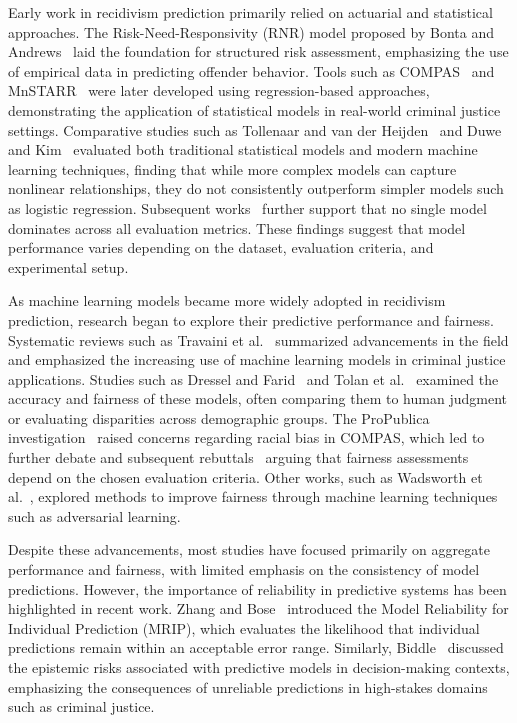 \documentclass[12pt]{article}
\begin{document}
Early work in recidivism prediction primarily relied on actuarial and statistical approaches. The Risk-Need-Responsivity (RNR) model proposed by Bonta and Andrews~\cite{bonta2007risk} laid the foundation for structured risk assessment, emphasizing the use of empirical data in predicting offender behavior. Tools such as COMPAS~\cite{northpointe2015practitioner} and MnSTARR~\cite{duwe2014development} were later developed using regression-based approaches, demonstrating the application of statistical models in real-world criminal justice settings. Comparative studies such as Tollenaar and van der Heijden~\cite{tollenaar2013method} and Duwe and Kim~\cite{kim2023black} evaluated both traditional statistical models and modern machine learning techniques, finding that while more complex models can capture nonlinear relationships, they do not consistently outperform simpler models such as logistic regression. Subsequent works~\cite{ozkan2017predicting,ngo2018traditional,kovalchuk2023prediction} further support that no single model dominates across all evaluation metrics. These findings suggest that model performance varies depending on the dataset, evaluation criteria, and experimental setup.

As machine learning models became more widely adopted in recidivism prediction, research began to explore their predictive performance and fairness. Systematic reviews such as Travaini et al.~\cite{travaini2022machine} summarized advancements in the field and emphasized the increasing use of machine learning models in criminal justice applications. Studies such as Dressel and Farid~\cite{dressel2018accuracy} and Tolan et al.~\cite{tolan2019machine} examined the accuracy and fairness of these models, often comparing them to human judgment or evaluating disparities across demographic groups. The ProPublica investigation~\cite{propublica2016analysis} raised concerns regarding racial bias in COMPAS, which led to further debate and subsequent rebuttals~\cite{dieterich2016compas,corbett2017algorithmic,flores2016false} arguing that fairness assessments depend on the chosen evaluation criteria. Other works, such as Wadsworth et al.~\cite{wadsworth2018achieving}, explored methods to improve fairness through machine learning techniques such as adversarial learning.

Despite these advancements, most studies have focused primarily on aggregate performance and fairness, with limited emphasis on the consistency of model predictions. However, the importance of reliability in predictive systems has been highlighted in recent work. Zhang and Bose~\cite{zhang2024reliability} introduced the Model Reliability for Individual Prediction (MRIP), which evaluates the likelihood that individual predictions remain within an acceptable error range. Similarly, Biddle~\cite{biddle2022predicting} discussed the epistemic risks associated with predictive models in decision-making contexts, emphasizing the consequences of unreliable predictions in high-stakes domains such as criminal justice.
\end{document}
